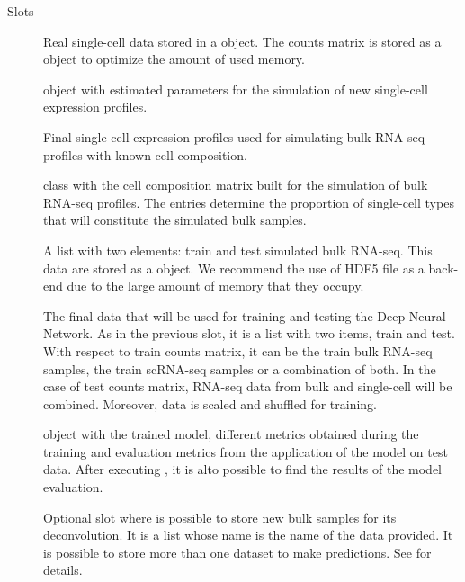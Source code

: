 \documentclass[a4paper]{book}
\begin{document}
%
\begin{Section}{Slots}

\begin{description}

\item[] Real single-cell data stored in a
 object. The counts matrix is stored as a
 object to optimize the amount of used memory.

\item[]  object with estimated parameters for the
simulation of new single-cell expression profiles.

\item[] Final single-cell expression profiles used for
simulating bulk RNA-seq profiles with known cell composition.

\item[]  class with the cell
composition  matrix built for the simulation of bulk RNA-seq profiles. The
entries determine the proportion of single-cell types that will constitute
the simulated bulk samples.

\item[] A list with two elements: train and test simulated bulk
RNA-seq. This data are stored as a  object. We
recommend the use of HDF5 file as a back-end due to the large amount of
memory that they occupy.

\item[] The final data that will be used for training and testing
the Deep Neural Network. As in the previous slot, it is a list with two
items, train and test. With respect to train counts matrix, it can be the
train bulk RNA-seq samples, the train scRNA-seq samples or a combination of
both. In the case of test counts matrix, RNA-seq data from bulk and
single-cell will be combined. Moreover, data is scaled and shuffled for
training.

\item[]  object with the trained
model, different metrics obtained during the training and evaluation
metrics from the application of the model on test data. After executing
, it is alto possible to find the results
of the model evaluation.

\item[] Optional slot where is possible to store new bulk samples
for its deconvolution. It is a list whose name is the name of the data
provided. It is possible to store more than one dataset to make
predictions. See  for details.


\end{description}
\end{Section}
\end{document}

